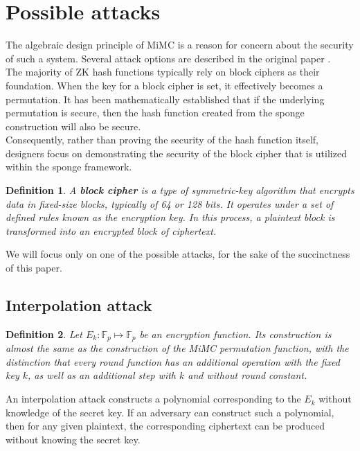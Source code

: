 \documentclass[letterpaper, bothsides, 12pt]{article} %
\newtheorem{definition}{Definition}
\begin{document}
\section{Possible attacks}
The algebraic design principle of MiMC is a reason for concern about the security of such a system. Several attack options are described in the original paper \cite{zbMATH06679506}. \\

The majority of ZK hash functions typically rely on block ciphers as their foundation. When the key for a block cipher is set, it effectively becomes a permutation. It has been mathematically established that if the underlying permutation is secure, then the hash function created from the sponge construction will also be secure. \\ 

Consequently, rather than proving the security of the hash function itself, designers focus on demonstrating the security of the block cipher that is utilized within the sponge framework. \\

\begin{definition}
A \textbf{block cipher} is a type of symmetric-key algorithm that encrypts data in fixed-size blocks, typically of 64 or 128 bits. It operates under a set of defined rules known as the encryption key. In this process, a plaintext block is transformed into an encrypted block of ciphertext.
\end{definition}

We will focus only on one of the possible attacks, for the sake of the succinctness of this paper. 

\subsection{Interpolation attack}

\begin{definition}
    Let $E_k \colon \mathbb{F}_p \mapsto \mathbb{F}_p$ be an encryption function. Its construction is almost the same as the construction of the MiMC permutation function, with the distinction that every round function has an additional operation with the fixed key $k$, as well as an additional step with $k$ and without round constant. \\
\end{definition}

An interpolation attack constructs a polynomial corresponding to the $E_k$ without knowledge of the secret key. If an adversary can construct such a polynomial, then for any given plaintext, the corresponding ciphertext can be produced without knowing the secret key.
\end{document}
